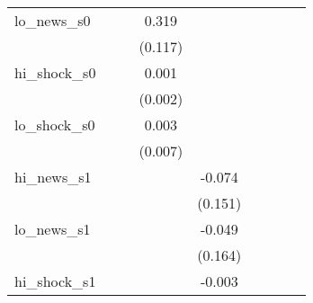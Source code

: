 {\begin{tabular}{l*{8}{c}}
\addlinespace
lo\_news\_s0  &                     &                     &       0.319\sym{**} &                     &                     &                     &                     &                     \\
            &                     &                     &     (0.117)         &                     &                     &                     &                     &                     \\
\addlinespace
hi\_shock\_s0 &                     &                     &       0.001         &                     &                     &                     &                     &                     \\
            &                     &                     &     (0.002)         &                     &                     &                     &                     &                     \\
\addlinespace
lo\_shock\_s0 &                     &                     &       0.003         &                     &                     &                     &                     &                     \\
            &                     &                     &     (0.007)         &                     &                     &                     &                     &                     \\
\addlinespace
hi\_news\_s1  &                     &                     &                     &      -0.074         &                     &                     &                     &                     \\
            &                     &                     &                     &     (0.151)         &                     &                     &                     &                     \\
\addlinespace
lo\_news\_s1  &                     &                     &                     &      -0.049         &                     &                     &                     &                     \\
            &                     &                     &                     &     (0.164)         &                     &                     &                     &                     \\
\addlinespace
hi\_shock\_s1 &                     &                     &                     &      -0.003         &                     &                     &                     &                     \\

\end{tabular}}
